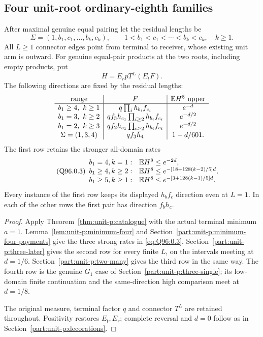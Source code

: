 \subsection{Four unit-root ordinary-eighth families}
\label{proof:Q5-C096-ordinary}
After maximal genuine equal pairing let the residual lengths be
\begin{equation}\tag{Q96.0.1}\label{eq:Q96:0.1}
 \Sigma=(1,b_1,c_1,\ldots,b_k,c_k),\qquad
 1<b_1<c_1<\cdots<b_k<c_k,\quad k\ge1 .
\end{equation}
All \(L\ge1\) connector edges point from terminal to receiver,
whose existing unit arm is outward. For genuine equal-pair
products at the two roots, including empty products, put
\begin{equation}\tag{Q96.0.2}\label{eq:Q96:0.2}
 H=E_rpT^L(E_tF).
\end{equation}
The following directions are fixed by the residual lengths:
\[
\begin{array}{c|c|c}
\text{range}&F&\mathbb E H^8\text{ upper}\\\hline
b_1\ge4,\ k\ge1&q\prod_i h_{b_i}f_{c_i}&e^{-d}\\
b_1=3,\ k\ge2&qf_3h_{c_1}\prod_{i\ge2}h_{b_i}f_{c_i}&e^{-d/2}\\
b_1=2,\ k\ge3&qf_2h_{c_1}\prod_{i\ge2}h_{b_i}f_{c_i}&e^{-d/2}\\
\Sigma=(1,3,4)&qf_3h_4&1-d/601 .
\end{array}
\]
The first row retains the stronger all-domain rates
\begin{equation}\tag{Q96.0.3}\label{eq:Q96:0.3}
\begin{array}{ll}
b_1=4,k=1:&\mathbb E H^8\le e^{-2d},\\
b_1\ge4,k\ge2:&\mathbb E H^8\le e^{-[18+128(k-2)/5]d},\\
b_1\ge5,k\ge1:&\mathbb E H^8\le e^{-[3+128(k-1)/5]d}.
\end{array}
\end{equation}
Every instance of the first row keeps its displayed \(h_bf_c\) direction
even at \(L=1\). In each of the other rows the first pair has direction
\(f_bh_c\).

\begin{proof}
Apply Theorem~\ref{thm:unit-p:catalogue} with the actual terminal
minimum \(a=1\). Lemma~\ref{lem:unit-p:minimum-four} and
Section~\ref{part:unit-p:minimum-four-payments} give the three
strong rates in \eqref{eq:Q96:0.3}. Section~\ref{part:unit-p:three-later} gives the second row for every
finite \(L\), on the intervals meeting at \(d=1/6\).
Section~\ref{part:unit-p:two-many} gives the third row in the
same way. The fourth row is the genuine \(G_1\) case of
Section~\ref{part:unit-p:three-single}; its low-domain
finite continuation and the same-direction high comparison
meet at \(d=1/8\).

The original measure, terminal factor \(q\) and connector \(T^L\)
are retained throughout. Positivity restores \(E_t,E_r\);
complete reversal and \(d=0\) follow as in
Section~\ref{part:unit-p:decorations}.
\end{proof}
